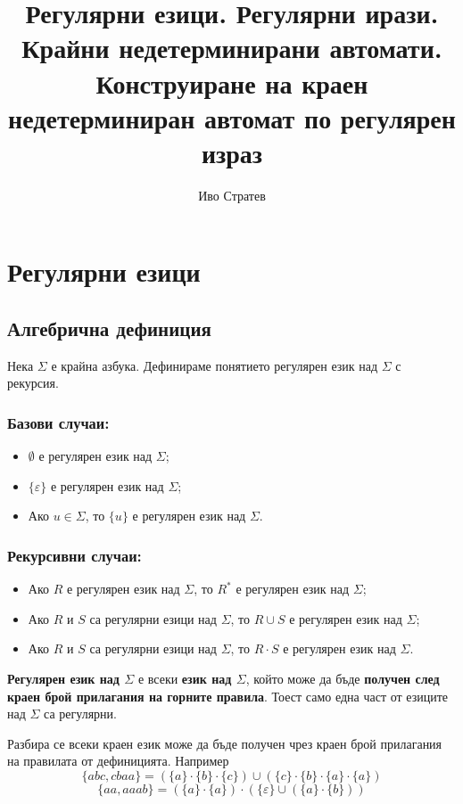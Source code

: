 \documentclass[12pt]{article}
\title{Регулярни езици.
Регулярни ирази.
Крайни недетерминирани автомати.
Конструиране на краен недетерминиран автомат по регулярен израз}
\author{Иво Стратев}
\begin{document}
\maketitle

\section{Регулярни езици}

\subsection{Алгебрична дефиниция}
Нека \(\Sigma\) е крайна азбука.
Дефинираме понятието регулярен език над \(\Sigma\) с рекурсия.

\subsubsection{Базови случаи:}
\begin{itemize}
    \item \(\emptyset\) е регулярен език над \(\Sigma\);
    \item \(\{\varepsilon\}\) е регулярен език над \(\Sigma\);
    \item Ако \(u \in \Sigma\), то \(\{u\}\) е регулярен език над \(\Sigma\).
\end{itemize}

\subsubsection{Рекурсивни случаи:}
\begin{itemize}
    \item Ако \(R\) е регулярен език над \(\Sigma\), то \(R^*\) е регулярен език над \(\Sigma\);
    \item Ако \(R\) и \(S\) са регулярни езици над \(\Sigma\), то \(R \cup S\) е регулярен език над \(\Sigma\);
    \item Ако \(R\) и \(S\) са регулярни езици над \(\Sigma\), то \(R \cdot S\) е регулярен език над \(\Sigma\).
\end{itemize}

\textbf{Регулярен език над \(\Sigma\)} е всеки \textbf{език над \(\Sigma\)}, който може да бъде \textbf{получен след краен брой прилагания на горните правила}.
Тоест само една част от езиците над \(\Sigma\) са регулярни.
\\\par
Разбира се всеки краен език може да бъде получен чрез краен брой прилагания на правилата от дефиницията. Например 
\[\{abc, cbaa\} = (\{a\} \cdot \{b\} \cdot \{c\}) \cup (\{c\} \cdot \{b\} \cdot \{a\} \cdot \{a\})\]
\[\{aa, aaab\} = (\{a\} \cdot \{a\}) \cdot (\{\varepsilon\} \cup (\{a\} \cdot \{b\} ))\]
\end{document}
